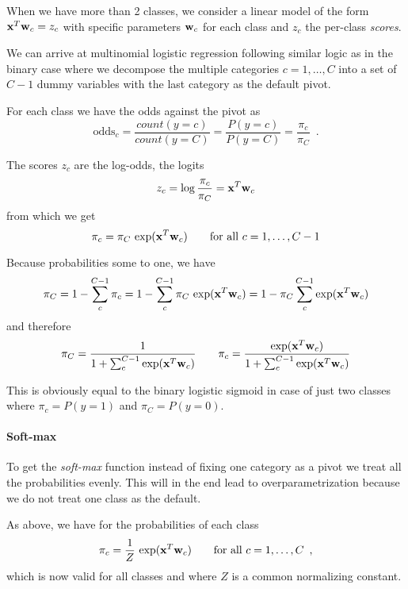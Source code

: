When we have more than 2 classes, we consider a linear model of the form $\mathbf{x}^T \mathbf{w}_c = z_c$ with specific parameters $\mathbf{w}_c$ for each class and $z_c$ the per-class \emph{scores}.

We can arrive at multinomial logistic regression following similar logic as in the binary case where we decompose the multiple categories $c = 1, \ldots, C$ into a set of $C-1$ dummy variables with the last category as the default pivot.

For each class we have the odds against the pivot as
\begin{equation}
\text{odds}_c = \frac{count(y=c)}{count(y = C)} = \frac{P(y=c)}{P(y =C )} = \frac{\pi_c}{\pi_C} \enspace .    
\end{equation}

The scores $z_c$ are the log-odds, the logits
\begin{equation}
z_c = \log \frac{\pi_c}{\pi_C} = \mathbf{x}^T \mathbf{w}_c
\end{equation}
from which we get
\begin{equation}
\pi_c = \pi_C \, \exp(\mathbf{x}^T \mathbf{w}_c) \qquad \text{for all } c=1, \ldots, C-1
\end{equation}


Because probabilities some to one, we have 
\begin{equation}
\pi_C = 1 - \sum_c^{C-1} \pi_c = 1 - \sum_c^{C-1} \pi_C \, \exp(\mathbf{x}^T \mathbf{w}_c) = 1 -  \pi_C \sum_c^{C-1} \exp(\mathbf{x}^T \mathbf{w}_c)
\end{equation}
and therefore 
\begin{equation}\label{eq_logistic:multinomial}
\pi_C = \frac{1}{1+\sum_c^{C-1} \exp(\mathbf{x}^T \mathbf{w}_c)} \qquad \pi_c = \frac{\exp(\mathbf{x}^T \mathbf{w}_c)}{1+\sum_c^{C-1} \exp(\mathbf{x}^T \mathbf{w}_c)}
\end{equation}

This is obviously equal to the binary logistic sigmoid in case of just two classes where $\pi_c =  P(y=1)$ and $\pi_C = P(y=0)$.

\paragraph{Soft-max} To get the \emph{soft-max} function instead of fixing one category as a pivot we treat all the probabilities evenly. This will in the end lead to overparametrization because we do not treat one class as the default.

As above, we have for the probabilities of each class
\begin{equation}
\pi_c = \frac{1}{Z} \, \exp(\mathbf{x}^T \mathbf{w}_c) \qquad \text{for all } c=1, \ldots, C \enspace ,
\end{equation}
which is now valid for all classes and where $Z$ is a common normalizing constant.

